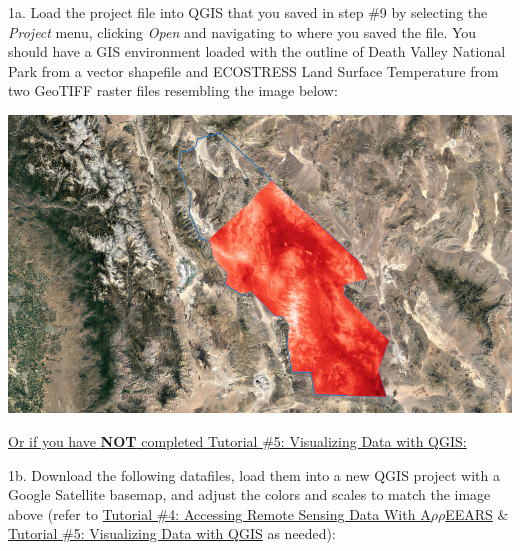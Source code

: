 \documentclass[oneside,a4paper,11pt,explicit]{book}
\begin{document}
\vspace{.5em}

1a. Load the project file into QGIS that you saved in step \#9 by selecting the \textit{Project} menu, clicking \textit{Open} and navigating to where you saved the file. You should have a GIS environment loaded with the outline of Death Valley National Park from a vector shapefile and ECOSTRESS Land Surface Temperature from two GeoTIFF raster files resembling the image below:

\vspace{.5em}

\centerline{\includegraphics[width=\textwidth]{TempMap1.jpg}}

\vspace{.5em}

\underline{Or if you have \textbf{NOT} completed \href{https://jeremydforsythe.github.io/icecream-tutorials/Tutorial5_VisualizingDataWithQGIS/Tutorial5_VisualizingDataWithQGIS.pdf}{Tutorial \#5: Visualizing Data with QGIS}:}

\vspace{.5em}

1b. Download the following datafiles, load them into a new QGIS project with a Google Satellite basemap, and adjust the colors and scales to match the image above (refer to \href{https://jeremydforsythe.github.io/icecream-tutorials/Tutorial4_AccessingRemoteSensingDataWithAppears/Tutorial4_AccessingRemoteSensingDataWithAppears.pdf}{Tutorial \#4: Accessing Remote Sensing Data With A$\rho\rho$EEARS} \& \href{https://jeremydforsythe.github.io/icecream-tutorials/Tutorial5_VisualizingDataWithQGIS/Tutorial5_VisualizingDataWithQGIS.pdf}{Tutorial \#5: Visualizing Data with QGIS} as needed):
\end{document}

